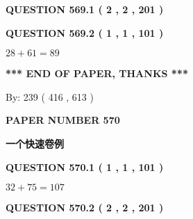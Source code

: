 \documentclass{ctexart}
\begin{document}
   
  
\vspace{0.2in}
  
{\textbf{\Large{QUESTION
569.1 
 ( 2 , 2 , 201 )
}}}
  
  
  
\vspace{0.2in}
  
{\textbf{\Large{QUESTION
569.2 
 ( 1 , 1 , 101 )
}}}
  
  
 
 

$ %
28 +  %
61=   %
89$
 
 
   
   
 \vspace{0.2in}
 
   
   
   
   
\vspace{1.0in} 
{\textbf{\large{ *** END OF PAPER, THANKS *** }}} 
   
   
\hspace{1.0in} By: 
 239 ( 416 ,  613 )
   
   
   
   
\newpage 
\setcounter{page}{ 
   570001 } 
   
   
   
   
 {\textbf{ \Large{ PAPER NUMBER  570  }}}
   
   
\vspace{0.2in}
   
   
   
   
   
   
 \vspace{0.2in}
{\LARGE {\textbf{ 一个快速卷例}}}
   
   
  
\vspace{0.2in}
  
{\textbf{\Large{QUESTION
570.1 
 ( 1 , 1 , 101 )
}}}
  
  
 
 

$ %
32 +  %
75=   %
107$
 
 
  
\vspace{0.2in}
  
{\textbf{\Large{QUESTION
570.2 
 ( 2 , 2 , 201 )
}}}
  
  
   
\end{document}
